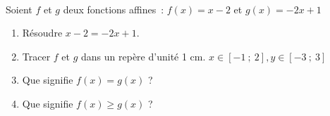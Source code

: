 \exercice ~\\

Soient $f$ et $g$ deux fonctions affines~: $f(x)=x-2$ et $g(x)=-2x+1$
\begin{enumerate}
	\item Résoudre $x - 2 = -2x + 1$.
	\item Tracer $f$ et $g$ dans un repère d'unité 1 cm. $x \in \left[-1~;~2\right], y \in \left[-3~;~3\right]$
	\item Que signifie $f(x) = g(x)$ ?
	\item Que signifie $f(x) \geqslant g(x)$ ?
\end{enumerate}